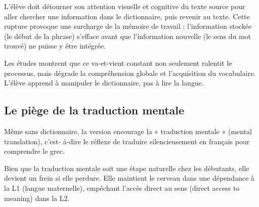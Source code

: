 L'élève doit détourner son attention visuelle et cognitive du texte source pour aller chercher une
information dans le dictionnaire, puis revenir au texte. Cette rupture provoque une surcharge de la
mémoire de travail : l'information stockée (le début de la phrase) s'efface avant que l'information
nouvelle (le sens du mot trouvé) ne puisse y être intégrée.

Les études montrent que ce va-et-vient constant non seulement ralentit le processus, mais dégrade la
compréhension globale et l'acquisition du vocabulaire.\cite{II-3-1-ref30} L'élève apprend à
manipuler le dictionnaire, pas à lire la langue.



\subsection{Le piège de la traduction mentale}

Même sans dictionnaire, la version encourage la « traduction mentale » (mental translation), c'est-
à-dire le réflexe de traduire silencieusement en français pour comprendre le
grec.\cite{II-3-1-ref38}

Bien que la traduction mentale soit une étape naturelle chez les débutants, elle devient un frein si
elle perdure.\cite{II-3-1-ref28} Elle maintient le cerveau dans une dépendance à la L1 (langue
maternelle), empêchant l'accès direct au sens (direct access to meaning) dans la L2.


